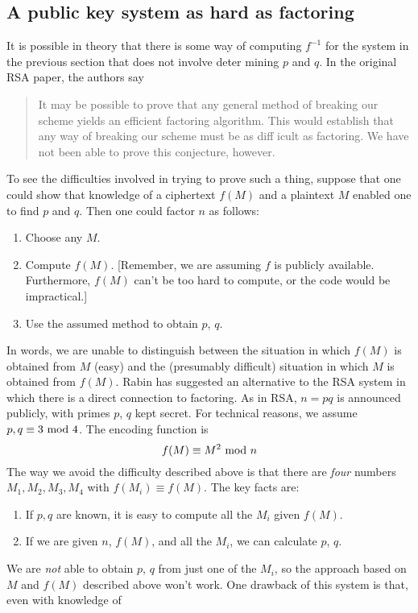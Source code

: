 \subsection{A public key system as hard as factoring\label{Ra}}
It is possible in theory that there is some way of computing $f^{-1}$
for the system in the previous section that does not involve deter%
mining $p$ and $q$. In the original RSA paper, the authors say
\begin{quotation}It may be possible to prove that any general method
of breaking our scheme yields an efficient factoring algorithm.  This
would establish that any way of breaking our scheme must be as diff%
icult as factoring. We have not been able to prove this conjecture,
however.\end{quotation}
To see the difficulties involved in trying to prove such a thing,
suppose that one could show that knowledge of a ciphertext $f(M)$
and a plaintext $M$ enabled one to find $p$ and $q$.  Then one 
could factor $n$ as follows:\begin{enumerate}
\item Choose any $M$.\item Compute $f(M)$.  [Remember, we are assuming
$f$ is publicly available.  Furthermore, $f(M)$ can't be too hard
to compute, or the code would be impractical.]\item Use the assumed
method to obtain $p$, $q$.\end{enumerate}
In words, we are unable to distinguish between the situation
in which $f(M)$ is obtained from $M$ (easy) and the (presumably difficult)
situation in which $M$ is obtained from $f(M)$.
\pq Rabin has suggested an alternative to the RSA system in which there
is a direct connection to factoring.  As in RSA, $n=pq$ is announced
publicly, with primes $p$, $q$ kept secret.  For technical reasons, we
assume $p,q\equiv3\hbox{ mod }4$.
The encoding function is  $$f(M)\equiv M^2\hbox{ mod }n$$  
 The way we avoid the difficulty described above is that there are 
{\it four\/} numbers $M_1,M_2,M_3,M_4$ with $f(M_i)\equiv f(M)$.  The
key facts are:\begin{enumerate}\item If $p,q$ are known, it is easy
to compute all the $M_i$ given $f(M)$.\item If we are given $n$, $f(M)$,
and all the $M_i$, we can calculate $p$, $q$.
\end{enumerate}We are {\it not\/} able to obtain $p$, $q$ from just one
of the $M_i$, so the approach based on $M$ and $f(M)$ described above
won't work.  One drawback of this system is that, even with knowledge of
